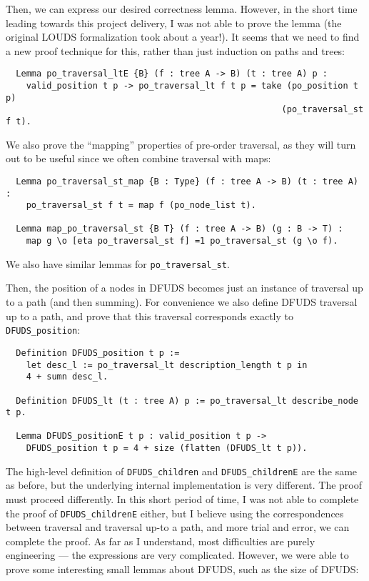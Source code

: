 \documentclass[11pt]{article}
\def\coqin#1{\texttt{#1}}
\begin{document}
Then, we can express our desired correctness lemma. However, in the short time leading towards this project delivery, I was not able to
prove the lemma (the original LOUDS formalization took about a year!). It seems that we need to find a new proof technique for this, rather
than just induction on paths and trees:

\begin{verbatim}
  Lemma po_traversal_ltE {B} (f : tree A -> B) (t : tree A) p :
    valid_position t p -> po_traversal_lt f t p = take (po_position t p)
                                                      (po_traversal_st f t).
\end{verbatim}

We also prove the ``mapping'' properties of pre-order traversal, as they will turn out to be useful since we often combine traversal with maps:

\begin{verbatim}
  Lemma po_traversal_st_map {B : Type} (f : tree A -> B) (t : tree A) :
    po_traversal_st f t = map f (po_node_list t).
  
  Lemma map_po_traversal_st {B T} (f : tree A -> B) (g : B -> T) :
    map g \o [eta po_traversal_st f] =1 po_traversal_st (g \o f).
\end{verbatim}

We also have similar lemmas for \coqin{po_traversal_st}.

Then, the position of a nodes in DFUDS becomes just an instance of traversal up to a path (and then summing). For convenience we also define
DFUDS traversal up to a path, and prove that this traversal corresponds exactly to \coqin{DFUDS_position}:

\begin{verbatim}
  Definition DFUDS_position t p :=
    let desc_l := po_traversal_lt description_length t p in
    4 + sumn desc_l.

  Definition DFUDS_lt (t : tree A) p := po_traversal_lt describe_node t p.
    
  Lemma DFUDS_positionE t p : valid_position t p ->
    DFUDS_position t p = 4 + size (flatten (DFUDS_lt t p)).
\end{verbatim}

The high-level definition of \coqin{DFUDS_children} and \coqin{DFUDS_childrenE} are the same as before, but the underlying internal implementation
is very different. The proof must proceed differently. In this short period of time, I was not able to complete the proof of
\coqin{DFUDS_childrenE} either, but I believe using the correspondences between traversal and traversal up-to a path, and more trial and
error, we can complete the proof. As far as I understand, most difficulties are purely engineering --- the expressions are very complicated.
However, we were able to prove some interesting small lemmas about DFUDS, such as the size of DFUDS:
\end{document}
